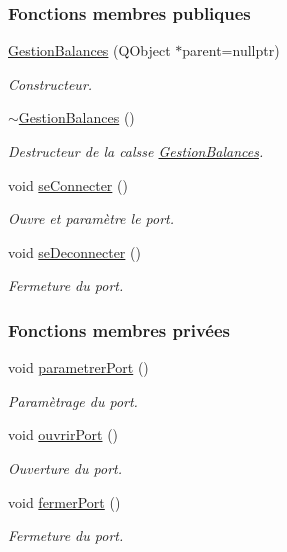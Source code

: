 \subsubsection*{Fonctions membres publiques}
\begin{DoxyCompactItemize}
\item 
\hyperlink{class_gestion_balances_a68f1e2d248971ff912f4ce5e2a24b6ef}{Gestion\+Balances} (Q\+Object $\ast$parent=nullptr)
\begin{DoxyCompactList}\small\item\em Constructeur. \end{DoxyCompactList}\item 
\hyperlink{class_gestion_balances_a6cb93817424cba3ac1f1593f5948d2ee}{$\sim$\+Gestion\+Balances} ()
\begin{DoxyCompactList}\small\item\em Destructeur de la calsse \hyperlink{class_gestion_balances}{Gestion\+Balances}. \end{DoxyCompactList}\item 
void \hyperlink{class_gestion_balances_ac3bb603b39f9b89732da2dc576903924}{se\+Connecter} ()
\begin{DoxyCompactList}\small\item\em Ouvre et paramètre le port. \end{DoxyCompactList}\item 
void \hyperlink{class_gestion_balances_a25880f41779aa8fdeac7ae972b09ff36}{se\+Deconnecter} ()
\begin{DoxyCompactList}\small\item\em Fermeture du port. \end{DoxyCompactList}\end{DoxyCompactItemize}
\subsubsection*{Fonctions membres privées}
\begin{DoxyCompactItemize}
\item 
void \hyperlink{class_gestion_balances_aca48b0074aaef7b8d4d9da45c3d6a3a9}{parametrer\+Port} ()
\begin{DoxyCompactList}\small\item\em Paramètrage du port. \end{DoxyCompactList}\item 
void \hyperlink{class_gestion_balances_a8d7031310e6b9530c0a9e47c142aaf39}{ouvrir\+Port} ()
\begin{DoxyCompactList}\small\item\em Ouverture du port. \end{DoxyCompactList}\item 
void \hyperlink{class_gestion_balances_a4c59a33f55b0c97f0ea4fb63b7791c0c}{fermer\+Port} ()
\begin{DoxyCompactList}\small\item\em Fermeture du port. \end{DoxyCompactList}\end{DoxyCompactItemize}
